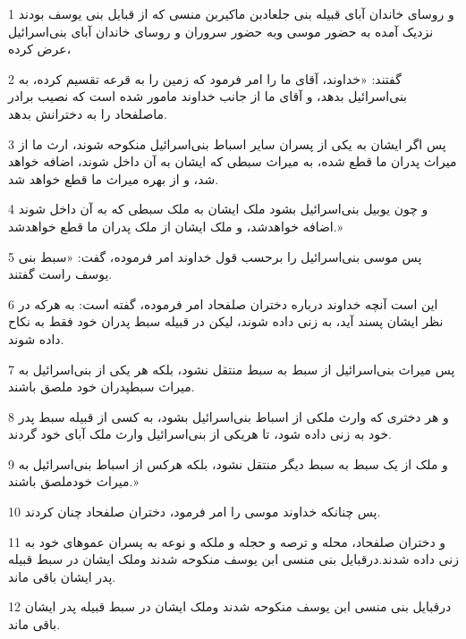 \par 1 و روسای خاندان آبای قبیله بنی جلعادبن ماکیربن منسی که از قبایل بنی یوسف بودند نزدیک آمده به حضور موسی وبه حضور سروران و روسای خاندان آبای بنی‌اسرائیل عرض کرده،
\par 2 گفتند: «خداوند، آقای ما را امر فرمود که زمین را به قرعه تقسیم کرده، به بنی‌اسرائیل بدهد، و آقای ما از جانب خداوند مامور شده است که نصیب برادر ماصلفحاد را به دخترانش بدهد.
\par 3 پس اگر ایشان به یکی از پسران سایر اسباط بنی‌اسرائیل منکوحه شوند، ارث ما از میراث پدران ما قطع شده، به میراث سبطی که ایشان به آن داخل شوند، اضافه خواهد شد، و از بهره میراث ما قطع خواهد شد.
\par 4 و چون یوبیل بنی‌اسرائیل بشود ملک ایشان به ملک سبطی که به آن داخل شوند اضافه خواهدشد، و ملک ایشان از ملک پدران ما قطع خواهدشد.»
\par 5 پس موسی بنی‌اسرائیل را برحسب قول خداوند امر فرموده، گفت: «سبط بنی یوسف راست گفتند.
\par 6 این است آنچه خداوند درباره دختران صلفحاد امر فرموده، گفته است: به هر‌که در نظر ایشان پسند آید، به زنی داده شوند، لیکن در قبیله سبط پدران خود فقط به نکاح داده شوند.
\par 7 پس میراث بنی‌اسرائیل از سبط به سبط منتقل نشود، بلکه هر یکی از بنی‌اسرائیل به میراث سبطپدران خود ملصق باشند.
\par 8 و هر دختری که وارث ملکی از اسباط بنی‌اسرائیل بشود، به کسی از قبیله سبط پدر خود به زنی داده شود، تا هریکی از بنی‌اسرائیل وارث ملک آبای خود گردند.
\par 9 و ملک از یک سبط به سبط دیگر منتقل نشود، بلکه هرکس از اسباط بنی‌اسرائیل به میراث خودملصق باشند.»
\par 10 پس چنانکه خداوند موسی را امر فرمود، دختران صلفحاد چنان کردند.
\par 11 و دختران صلفحاد، محله و ترصه و حجله و ملکه و نوعه به پسران عموهای خود به زنی داده شدند.درقبایل بنی منسی ابن یوسف منکوحه شدند وملک ایشان در سبط قبیله پدر ایشان باقی ماند.
\par 12 درقبایل بنی منسی ابن یوسف منکوحه شدند وملک ایشان در سبط قبیله پدر ایشان باقی ماند.


